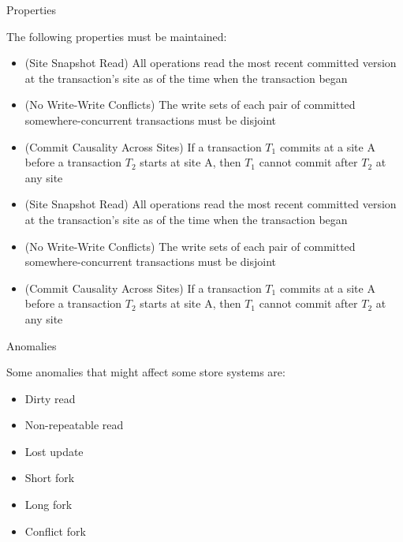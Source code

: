 \documentclass{beamer}
\begin{document}
		\begin{frame}{Properties}
		
		The following properties must be maintained:		
		\begin{itemize}
		\item (Site Snapshot Read) All operations read the most recent committed version at the transaction's site as of the time when the transaction began
		\item (No Write-Write Conflicts) The write sets of each pair of committed somewhere-concurrent transactions must be disjoint
		\item (Commit Causality Across Sites) If a transaction $T_{1}$ commits at a site A before a transaction $T_{2}$ starts at site A, then $T_{1}$ cannot commit after $T_{2}$ at any site
		\end{itemize}		
		
		\begin{itemize}
		\item (Site Snapshot Read) All operations read the most recent committed version at the transaction's site as of the time when the transaction began
		\item (No Write-Write Conflicts) The write sets of each pair of committed somewhere-concurrent transactions must be disjoint
		\item (Commit Causality Across Sites) If a transaction $T_{1}$ commits at a site A before a transaction $T_{2}$ starts at site A, then $T_{1}$ cannot commit after $T_{2}$ at any site
		\end{itemize}
		
		\end{frame}	

		\begin{frame}{Anomalies}
		
		Some anomalies that might affect some store systems are:
		\begin{itemize}
		\item Dirty read
		\item Non-repeatable read
		\item Lost update
		\item Short fork
		\item Long fork
		\item Conflict fork
		\end{itemize}		
		
		\end{frame}

\end{document}
